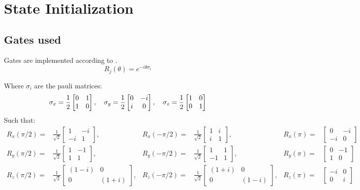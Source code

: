 \chapter{State Initialization}

\section{Gates used}
Gates are implemented according to \citet{Nielsen2010Quantum}.
\begin{equation}
    R_j(\theta)=e^{-i\theta \sigma_i}
\end{equation}

Where $\sigma_i$ are the pauli matrices:
\begin{equation}
\sigma_x=\frac{1}{2}\begin{bmatrix}0&1\\1&0\end{bmatrix}, \quad
\sigma_y=\frac{1}{2}\begin{bmatrix}0&-i\\i&0\end{bmatrix}\\,\quad
\sigma_z=\frac{1}{2}\begin{bmatrix}1&0\\0&1\end{bmatrix}
\end{equation}
Such that:
\begin{align*}
R_x(\pi/2)=&\frac{1}{\sqrt{2}}\begin{bmatrix}1&-i\\-i&1\end{bmatrix},
& R_x(-\pi/2)=&\frac{1}{\sqrt{2}}\begin{bmatrix}1&i\\i&1\end{bmatrix},
& R_x(\pi)=&\begin{bmatrix}0&-i\\-i&0\end{bmatrix}\\
%
R_y(\pi/2)=&\frac{1}{\sqrt{2}}\begin{bmatrix}1&-1\\1&1\end{bmatrix},
& R_y(-\pi/2)=&\frac{1}{\sqrt{2}}\begin{bmatrix}1&1\\-1&1\end{bmatrix},
& R_y(\pi)=&\begin{bmatrix}0&-1\\1&0\end{bmatrix}\\
%
R_z(\pi/2)=&\frac{1}{\sqrt{2}}\begin{bmatrix}(1-i)&0\\0&(1+i)\end{bmatrix},
& R_z(-\pi/2)=&\frac{1}{\sqrt{2}}\begin{bmatrix}(1+i)&0\\0&(1-i)\end{bmatrix},
& R_z(\pi)=&\begin{bmatrix}-i&0\\0&i\end{bmatrix}
\end{align*}

